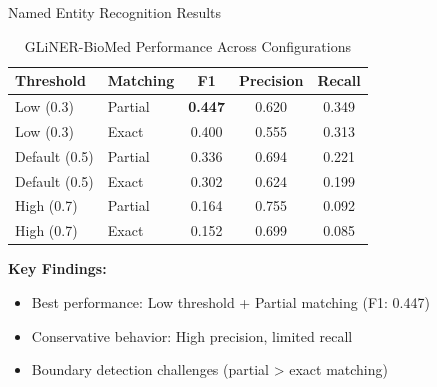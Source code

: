 \documentclass[aspectratio=169, 11pt]{beamer}
\begin{document}
\begin{frame}{Named Entity Recognition Results}
    \vspace{0.3cm}
    \begin{table}[h]
        \centering
        \footnotesize
        \caption{GLiNER-BioMed Performance Across Configurations}
        \begin{tabular}{llccc}
        \toprule
        \textbf{Threshold} & \textbf{Matching} & \textbf{F1} & \textbf{Precision} & \textbf{Recall} \\
        \midrule
        \textcolor{ulgreen}{Low (0.3)} & \textcolor{ulgreen}{Partial} & \textcolor{ulgreen}{\textbf{0.447}} & 0.620 & 0.349 \\
        Low (0.3) & Exact & 0.400 & 0.555 & 0.313 \\
        Default (0.5) & Partial & 0.336 & 0.694 & 0.221 \\
        Default (0.5) & Exact & 0.302 & 0.624 & 0.199 \\
        High (0.7) & Partial & 0.164 & 0.755 & 0.092 \\
        High (0.7) & Exact & 0.152 & 0.699 & 0.085 \\
        \bottomrule
        \end{tabular}
    \end{table}
    
    \vspace{0.4cm}
    \textbf{Key Findings:}
    \begin{itemize}
        \setlength{\itemsep}{0.2cm}
        \item Best performance: Low threshold + Partial matching (F1: 0.447)
        \item Conservative behavior: High precision, limited recall
        \item Boundary detection challenges (partial > exact matching)
    \end{itemize}
\end{frame}
\end{document}
